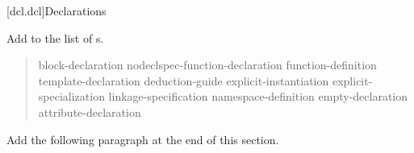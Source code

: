 
\setcounter{chapter}{9}
[dcl.dcl]{Declarations}

Add  to the list of s.

\begin{quote}
\begin{bnf}
\br
  block-declaration\br
  nodeclspec-function-declaration\br
  function-definition\br
  template-declaration\br
  deduction-guide\br
  explicit-instantiation\br
  explicit-specialization\br
  linkage-specification\br
  namespace-definition\br
  \br
  empty-declaration\br
  attribute-declaration
\end{bnf}
\end{quote}

Add the following paragraph at the end of this section.

\setcounter{Paras}{12}
\begin{quote}
\pnum
{}
\end{quote}

